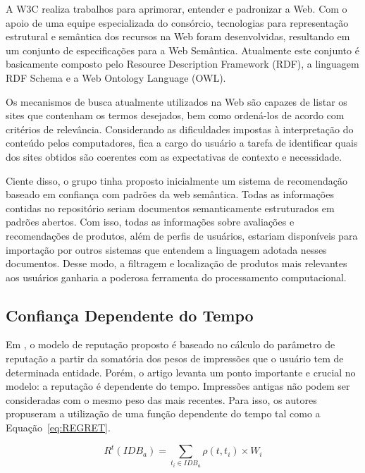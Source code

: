  A W3C realiza trabalhos para aprimorar, entender e padronizar a Web. Com o apoio de uma equipe especializada do consórcio, tecnologias para representação estrutural e semântica dos recursos na Web foram desenvolvidas, resultando em um conjunto de especificações para a Web Semântica. Atualmente este conjunto é basicamente composto pelo Resource Description Framework (RDF), a linguagem RDF Schema e a Web Ontology Language (OWL).

 Os mecanismos de busca atualmente utilizados na Web são capazes de listar os sites que contenham os termos desejados, bem como ordená-los de acordo com critérios de relevância. Considerando as dificuldades impostas à interpretação do conteúdo pelos computadores, fica a cargo do usuário a tarefa de identificar quais dos sites obtidos são coerentes com as expectativas de contexto e necessidade.

 Ciente disso, o grupo tinha proposto inicialmente um sistema de recomendação baseado em confiança com padrões da web semântica. Todas as informações contidas no repositório seriam documentos semanticamente estruturados em padrões abertos. Com isso, todas as informações sobre avaliações e recomendações de produtos, além de perfis de usuários, estariam disponíveis para importação por outros sistemas que entendem a linguagem adotada nesses documentos. Desse modo, a filtragem e localização de produtos mais relevantes aos usuários ganharia a poderosa ferramenta do processamento computacional.


\subsection{Confiança Dependente do Tempo} %
\label{sub:confianca_dependente_do_tempo}

 Em \cite{sabater2001regret}, o modelo de reputação proposto é baseado no cálculo do parâmetro de reputação a partir da somatória dos pesos de impressões que o usuário tem de determinada entidade. Porém, o artigo levanta um ponto importante e crucial no modelo: a reputação é dependente do tempo. Impressões antigas não podem ser consideradas com o mesmo peso das mais recentes. Para isso, os autores propuseram a utilização de uma função dependente do tempo tal como a Equação~\ref{eq:REGRET}.
 
\begin{equation}
 R^t(IDB_a) = {\sum_{t_i\in{IDB_a}}}\rho(t,t_i)\times{W_i}
 \label{eq:REGRET} 
\end{equation}

